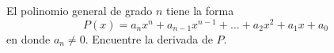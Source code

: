 \setcounter{enumi}{36}
\item El polinomio general de grado $n$ tiene la forma
$$P(x) = a_n x^n + a_{n-1} x^{n-1} + \dots + a_2 x^2 + a_1 x + a_0$$
en donde $a_n \ne 0$. Encuentre la derivada de $P$.
